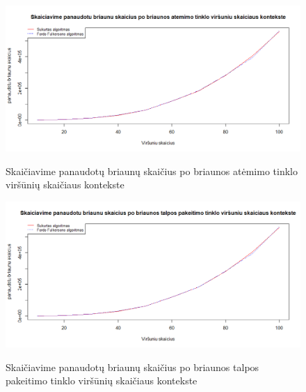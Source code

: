 \begin{figure}[H]
	\caption{Skaičiavime panaudotų briaunų skaičius po briaunos atėmimo tinklo viršūnių skaičiaus kontekste}
	\centering
	\includegraphics[width=\textwidth]{img/vre.png}
	\label{plot:vre}
\end{figure}
\begin{figure}[H]
	\caption{Skaičiavime panaudotų briaunų skaičius po briaunos talpos pakeitimo tinklo viršūnių skaičiaus kontekste}
	\centering
	\includegraphics[width=\textwidth]{img/vue.png}
	\label{plot:vue}
\end{figure}

